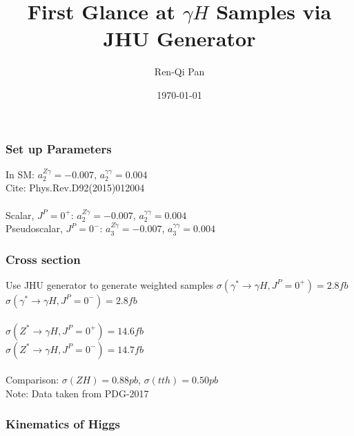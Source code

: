 \documentclass{beamer}
\title[gammaH]{First Glance at $\gamma H$ Samples via JHU Generator} %
\author{Ren-Qi Pan} %
\institute[ZJU] %
{
Zhejiang University\\ %
\medskip
}
\date{\today} %
\begin{document}
\begin{frame}
\titlepage %
\end{frame}

\begin{frame}
\begin{center}
\frametitle{Set up Parameters}
In SM: $a_{2}^{Z\gamma}=-0.007$, $a_{2}^{\gamma \gamma}=0.004$\\
Cite: Phys.Rev.D92(2015)012004\\
~\\
Scalar, $J^{P}=0^{+}$: $a_{2}^{Z\gamma}=-0.007$, $a_{2}^{\gamma \gamma}=0.004$\\
Pseudoscalar, $J^{P}=0^{-}$: $a_{3}^{Z\gamma}=-0.007$,  $a_{3}^{\gamma \gamma}=0.004$\\
\end{center}
\end{frame}

\begin{frame}
\frametitle{Cross section}
\begin{center}
Use JHU generator to generate weighted samples
$\sigma(\gamma^{*}\rightarrow\gamma H,J^{P}=0^{+})=2.8fb$\\
$\sigma(\gamma^{*}\rightarrow\gamma H,J^{P}=0^{-})=2.8fb$\\
~\\
$\sigma(Z^{*}\rightarrow\gamma H,J^{P}=0^{+})=14.6fb$\\
$\sigma(Z^{*}\rightarrow\gamma H,J^{P}=0^{-})=14.7fb$\\
~\\
Comparison: $\sigma(ZH)=0.88pb$, $\sigma(tth)=0.50pb$\\
Note: Data taken from PDG-2017


\end{center}
\end{frame}

\begin{frame}
\frametitle{Kinematics of Higgs}
\begin{figure}[H]
\setcounter{subfigure}{0}
\centering
{} 
\end{figure}
\end{frame}
\end{document}
